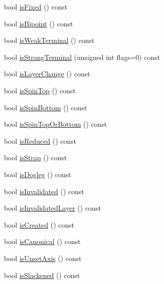 \begin{DoxyCompactItemize}
\item 
bool \hyperlink{classKatabatic_1_1AutoSegment_af5e7d3badddf2ec07159f1d83426d4c1}{is\-Fixed} () const 
\item 
bool \hyperlink{classKatabatic_1_1AutoSegment_ab5035e6d84cf3ec7b519a5acb109efaa}{is\-Bipoint} () const 
\item 
bool \hyperlink{classKatabatic_1_1AutoSegment_ae5574df7051a09ce3338cbe8481b8af3}{is\-Weak\-Terminal} () const 
\item 
bool \hyperlink{classKatabatic_1_1AutoSegment_acc92dc6f1ef0c36e7330f38726297b35}{is\-Strong\-Terminal} (unsigned int flags=0) const 
\item 
bool \hyperlink{classKatabatic_1_1AutoSegment_a0ddce124ab6b4cd97e59db077e7a2eac}{is\-Layer\-Change} () const 
\item 
bool \hyperlink{classKatabatic_1_1AutoSegment_aaff91f5124850956e44501facf668556}{is\-Spin\-Top} () const 
\item 
bool \hyperlink{classKatabatic_1_1AutoSegment_a0330666095b102f61bc957eefae34c4f}{is\-Spin\-Bottom} () const 
\item 
bool \hyperlink{classKatabatic_1_1AutoSegment_ad5a5ba75ef6654f9352cca1e4b0aff51}{is\-Spin\-Top\-Or\-Bottom} () const 
\item 
bool \hyperlink{classKatabatic_1_1AutoSegment_aca1e1b7dece8c71dcdc1ce786a0958e3}{is\-Reduced} () const 
\item 
bool \hyperlink{classKatabatic_1_1AutoSegment_a4721fcbe9c93ed5392afd9a756b989a8}{is\-Strap} () const 
\item 
bool \hyperlink{classKatabatic_1_1AutoSegment_a172b2394f9c2cbaaf5bc4b19e0e76e65}{is\-Dogleg} () const 
\item 
bool \hyperlink{classKatabatic_1_1AutoSegment_a54f713d06c43bebf4e0dfef06e347531}{is\-Invalidated} () const 
\item 
bool \hyperlink{classKatabatic_1_1AutoSegment_a52c4108abf5e0622a216c2d81c47b9bb}{is\-Invalidated\-Layer} () const 
\item 
bool \hyperlink{classKatabatic_1_1AutoSegment_a6a7e35dd5a9ca99ca879e424ce42b902}{is\-Created} () const 
\item 
bool \hyperlink{classKatabatic_1_1AutoSegment_ab671233e7112693ae31541190d1d251d}{is\-Canonical} () const 
\item 
bool \hyperlink{classKatabatic_1_1AutoSegment_a436eb0e5951f681ce68e429ab671e582}{is\-Unset\-Axis} () const 
\item 
bool \hyperlink{classKatabatic_1_1AutoSegment_ab1f9e0bca70dea59558459a003a62d88}{is\-Slackened} () const 

\end{DoxyCompactItemize}
